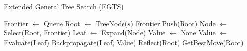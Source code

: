 \begin{algorithm}[H]
    \caption{Extended General Tree Search (EGTS)}
    \label{alg:general_tree_search_2}
    \begin{algorithmic}[1]
    
        \State Frontier $\leftarrow$ Queue
        \State Root $\leftarrow$ TreeNode($s$)
        \State Frontier.Push(Root)
            \State Node $\leftarrow$ Select(Root, Frontier)
            \State Leaf $\leftarrow$ Expand(Node)
            \State Value $\leftarrow$ None
                \State Value $\leftarrow$ Evaluate(Leaf)
            \EndIf
                \State Backpropagate(Leaf, Value)
            \EndIf
            \State Reflect(Root)
        \EndWhile
        \State \Return GetBestMove(Root)
    \EndProcedure
    \end{algorithmic}
\end{algorithm}